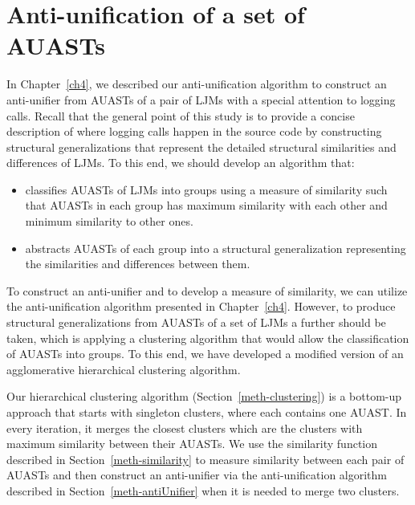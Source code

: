 \chapter{Anti-unification of a set of AUASTs}  \label{clustering}

In Chapter~\ref{ch4}, we described our anti-unification algorithm to construct an anti-unifier from AUASTs of a pair of LJMs with a special attention to logging calls. Recall that the general point of this study is to provide a concise description of where logging calls happen in the source code by constructing structural generalizations that represent the detailed structural similarities and differences of LJMs. To this end, we should develop an algorithm that:
\begin{itemize} [leftmargin=.5in]
\item classifies AUASTs of LJMs into groups using a measure of similarity such that AUASTs in each group has maximum similarity with each other and minimum similarity to other ones.
\item abstracts AUASTs of each group into a structural generalization representing the similarities and differences between them.
\end{itemize}

To construct an anti-unifier and to develop a measure of similarity, we can utilize the anti-unification algorithm presented in Chapter~\ref{ch4}. However, to produce structural generalizations from AUASTs of a set of LJMs a further should be taken, which is applying a clustering algorithm that would allow the classification of AUASTs into groups. To this end, we have developed a modified version of an agglomerative hierarchical clustering algorithm. 


Our hierarchical clustering algorithm (Section~\ref{meth-clustering}) is a bottom-up approach that starts with singleton clusters, where each contains one AUAST. In every iteration, it merges the closest clusters which are the clusters with maximum similarity between their AUASTs. We use the similarity function described in Section~\ref{meth-similarity} to measure similarity between each pair of AUASTs and then construct an anti-unifier via the anti-unification algorithm described in Section~\ref{meth-antiUnifier} when it is needed to merge two clusters. 

